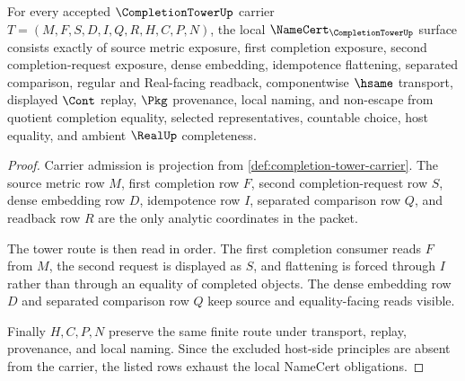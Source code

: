 \begin{theorem}
\label{thm:completion-tower-namecert-obligations}
For every accepted $\CompletionTowerUp$ carrier $T=(M,F,S,D,I,Q,R,H,C,P,N)$, the local $\NameCert_{\CompletionTowerUp}$ surface consists exactly of source metric exposure, first completion exposure, second completion-request exposure, dense embedding, idempotence flattening, separated comparison, regular and Real-facing readback, componentwise $\hsame$ transport, displayed $\Cont$ replay, $\Pkg$ provenance, local naming, and non-escape from quotient completion equality, selected representatives, countable choice, host equality, and ambient $\RealUp$ completeness.
\end{theorem}
\begin{proof}
Carrier admission is projection from \autoref{def:completion-tower-carrier}. The source metric row $M$, first completion row $F$, second completion-request row $S$, dense embedding row $D$, idempotence row $I$, separated comparison row $Q$, and readback row $R$ are the only analytic coordinates in the packet.

The tower route is then read in order. The first completion consumer reads $F$ from $M$, the second request is displayed as $S$, and flattening is forced through $I$ rather than through an equality of completed objects. The dense embedding row $D$ and separated comparison row $Q$ keep source and equality-facing reads visible.

Finally $H,C,P,N$ preserve the same finite route under transport, replay, provenance, and local naming. Since the excluded host-side principles are absent from the carrier, the listed rows exhaust the local NameCert obligations.
\end{proof}




